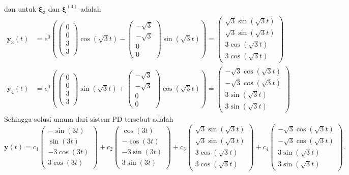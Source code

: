 \documentclass[a4paper]{article}
\theoremstyle{definisi}
\newcommand{\bfxi}{\boldsymbol{\xi}}
\numberwithin{equation}{section}
\begin{document}
\begin{enumerate}
\begin{align*}
    \end{align*} 
    dan untuk $\bfxi_3$ dan $\bfxi^{(4)}$ adalah
    \begin{align*}
      \mathbf{y}_3(t) &= e^{0}\left(\begin{pmatrix}0\\0\\3\\3\end{pmatrix}\cos(\sqrt{3}t) - \begin{pmatrix}-\sqrt{3}\\-\sqrt{3}\\0\\0\end{pmatrix}\sin(\sqrt{3}t)\right)=\begin{pmatrix}\sqrt{3}\sin(\sqrt{3}t)\\\sqrt{3}\sin(\sqrt{3}t)\\3\cos(\sqrt{3}t)\\3\cos(\sqrt{3}t)\end{pmatrix}\\
      \mathbf{y}_4(t) &= e^{0}\left(\begin{pmatrix}0\\0\\3\\3\end{pmatrix}\sin(\sqrt{3}t) + \begin{pmatrix}-\sqrt{3}\\-\sqrt{3}\\0\\0\end{pmatrix}\cos(\sqrt{3}t)\right)=\begin{pmatrix}-\sqrt{3}\cos(\sqrt{3}t)\\-\sqrt{3}\cos(\sqrt{3}t)\\3\sin(\sqrt{3}t)\\3\sin(\sqrt{3}t)\end{pmatrix}
    \end{align*}
    Sehingga solusi umum dari sistem PD tersebut adalah
    \[\mathbf{y}(t) = c_1\begin{pmatrix}-\sin(3t)\\\sin(3t)\\-3\cos(3t)\\3\cos(3t)\end{pmatrix} + c_2\begin{pmatrix}\cos(3t)\\-\cos(3t)\\-3\sin(3t)\\3\sin(3t)\end{pmatrix} + c_3\begin{pmatrix}\sqrt{3}\sin(\sqrt{3}t)\\\sqrt{3}\sin(\sqrt{3}t)\\3\cos(\sqrt{3}t)\\3\cos(\sqrt{3}t)\end{pmatrix} + c_4\begin{pmatrix}-\sqrt{3}\cos(\sqrt{3}t)\\-\sqrt{3}\cos(\sqrt{3}t)\\3\sin(\sqrt{3}t)\\3\sin(\sqrt{3}t)\end{pmatrix}.\]

\end{enumerate}
\end{document}
